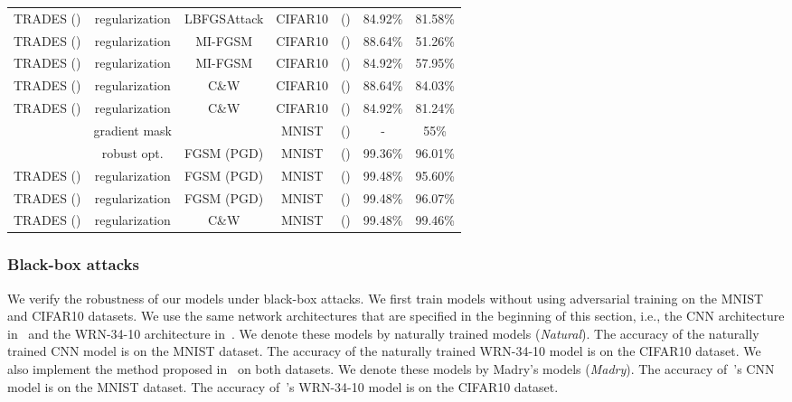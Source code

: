 \documentclass[11pt]{article}
\newcommand{\0}{\mathbf{0}}
\newcommand{\1}{\mathbf{1}}
\begin{document}
\begin{table*}
\begin{tabular}{c||c|c|c|c|c|c}
		{TRADES} () & regularization & LBFGSAttack  & CIFAR10 &   () & 84.92\% & 81.58\% \\
		{TRADES} () & regularization & MI-FGSM  & CIFAR10 &   () & 88.64\% & 51.26\% \\
		{TRADES} () & regularization & MI-FGSM & CIFAR10 &   () & 84.92\% & 57.95\% \\
		{TRADES} () & regularization & C\&W & CIFAR10 &   () & 88.64\% & 84.03\% \\
		{TRADES} () & regularization & C\&W & CIFAR10 &   () & 84.92\% & 81.24\% \\
		\hline
		\cite{samangouei2018defense} & gradient mask & \cite{athalye2018obfuscated} & MNIST &  () & - & 55\% \\
		\cite{madry2018towards} & robust opt. & FGSM (PGD) & MNIST &  () & 99.36\% & 96.01\% \\
		{TRADES} () & regularization & FGSM (PGD) & MNIST &   () & 99.48\% & 95.60\% \\
		{TRADES} () & regularization & FGSM (PGD) & MNIST &   () & 99.48\% & 96.07\% \\
		{TRADES} () & regularization & C\&W & MNIST &   () & 99.48\% & 99.46\% \\
		\hline
	\end{tabular}
\end{table*}

\vspace{-0.2cm}
\subsubsection{Black-box attacks}\label{subsec:black-box}

We verify the robustness of our models under black-box attacks. We first train models without using adversarial training on the MNIST and CIFAR10 datasets. We use the same network architectures that are specified in the beginning of this section, i.e., the CNN architecture in~\cite{carlini2017towards} and the WRN-34-10 architecture in~\cite{zagoruyko2016wide}. We denote these models by naturally trained models (\emph{Natural}). The accuracy of the naturally trained CNN model is  on the MNIST dataset. The accuracy of the naturally trained WRN-34-10 model is  on the CIFAR10 dataset. We also implement the method proposed in~\cite{madry2018towards} on both datasets. We denote these models by Madry's models (\emph{Madry}). The accuracy of~\cite{madry2018towards}'s CNN model is  on the MNIST dataset. The accuracy of~\cite{madry2018towards}'s WRN-34-10 model is  on the CIFAR10 dataset.
\end{document}
